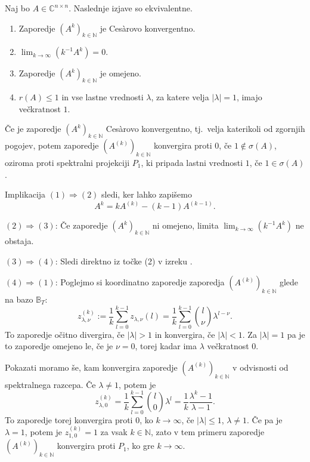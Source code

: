 \documentclass[mat1]{fmfdelo}
\newcommand{\N}{\mathbb N}
\newcommand{\C}{\mathbb C}
\begin{document}
\begin{izrek}\label{izrekCesaro}
    Naj bo $A \in \C^{n \times n}$. Naslednje izjave so ekvivalentne.
    \begin{enumerate}
        \item Zaporedje $(A^k)_{k\in\N}$ je Ces\`arovo konvergentno.
        \item $\lim_{k\rightarrow \infty} \left(k^{-1}A^k\right) = 0$.
        \item Zaporedje $(A^k)_{k\in\N}$ je omejeno.
        \item $r(A) \leq 1$ in vse lastne vrednosti $\lambda$, za katere velja $|\lambda| = 1$, imajo večkratnost $1$.
    \end{enumerate}
    Če je zaporedje $(A^k)_{k\in\N}$ Ces\`arovo konvergentno, tj.\ velja katerikoli od zgornjih pogojev, potem zaporedje $(A^{(k)})_{k\in\N}$ konvergira proti $0$, če $1 \notin \sigma(A)$, oziroma proti spektralni projekciji $P_1$, ki pripada lastni vrednosti $1$, če $1\in\sigma(A)$.
\end{izrek}
\begin{dokaz}
    Implikacija $(1) \Rightarrow (2)$ sledi, ker lahko zapišemo
    \begin{equation*}
        A^k = k A^{(k)} - (k-1) A^{(k-1)}.
    \end{equation*}

    \noindent $(2) \Rightarrow (3)$: Če zaporedje $(A^k)_{k\in\N}$ ni omejeno, limita $\lim_{k\rightarrow \infty} (k^{-1}A^k)$ ne obstaja.
    
    \noindent $(3) \Rightarrow (4)$: Sledi direktno iz točke (2) v izreku .
    
    \noindent $(4) \Rightarrow (1)$: Poglejmo si koordinatno zaporedje zaporedja $(A^{(k)})_{k\in\N}$ glede na bazo $\mathbb{B}_T$:
    \begin{equation*}
        z_{\lambda, \nu}^{(k)} := \frac{1}{k} \sum_{l=0}^{k-1} z_{\lambda, \nu} (l) = \frac{1}{k} \sum_{l=0}^{k-1}{l \choose \nu} \lambda^{l - \nu}.
    \end{equation*}
    To zaporedje očitno divergira, če $|\lambda| > 1$ in konvergira, če $|\lambda| < 1$. Za $|\lambda| = 1$ pa je to zaporedje omejeno le, če je $\nu = 0$, torej kadar ima $\lambda$ večkratnost $0$.

    \noindent Pokazati moramo še, kam konvergira zaporedje $(A^{(k)})_{k\in\N}$ v odvisnosti od spektralnega razcepa. Če $\lambda \neq 1$, potem je
    \begin{equation*}
        z_{\lambda, 0}^{(k)} = \frac{1}{k} \sum_{l=0}^{k-1}{l \choose 0} \lambda^{l} = \frac{1}{k}\frac{\lambda^k-1}{\lambda-1}.
    \end{equation*}
    To zaporedje torej konvergira proti $0$, ko $k\rightarrow\infty$, če $|\lambda|\leq 1$, $\lambda \neq 1$. Če pa je $\lambda = 1$, potem je $z_{1, 0}^{(k)} = 1$ za vsak $k \in \N$, zato v tem primeru zaporedje $(A^{(k)})_{k\in\N}$ konvergira proti $P_1$, ko gre $k\rightarrow\infty$. \qedhere

\end{dokaz}
\end{document}
